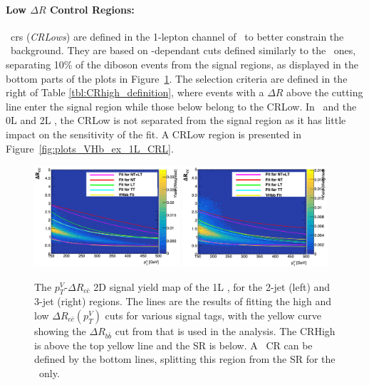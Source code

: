 \paragraph{Low $\Delta R$ Control Regions:} \lowdr\ \glspl{cr} (\textit{CRLows}) are defined in the 1-lepton channel of \vhb\ to better constrain the \whf\ background. They are based on \ptv-dependant cuts defined similarly to the \highdr\ ones, separating 10\% of the diboson events from the signal regions, as displayed in the bottom parts of the plots in Figure~\ref{fig:drccptvCutsVHcc}. The selection criteria are defined in the right of Table \ref{tbl:CRhigh_definition}, where events with a $\Delta R$ above the cutting line enter the signal region while those below belong to the CRLow. In \vhc\ and the 0L and 2L \vhb, the CRLow is not separated from the signal region as it has little impact on the sensitivity of the fit. A CRLow region is presented in Figure~\ref{fig:plots_VHb_ex_1L_CRL}.

\begin{figure}[h!]
  \center
  \includegraphics[width=0.48\textwidth]{Images/VH/dRccpTV/sr1.png}
  \includegraphics[width=0.48\textwidth]{Images/VH/dRccpTV/sr2.png}
  \caption{The $p_T^V$-$\Delta R_{c\bar{c}}$ 2D signal yield map of the 1L \vhc, for the 2-jet (left) and 3-jet (right) regions. The lines are the results of fitting the high and low $\Delta R_{c\bar{c}}(p_T^V)$ cuts for various signal tags, with the yellow curve showing the $\Delta R_{b\bar{b}}$ cut from \vhb that is used in the analysis. The CRHigh is above the top yellow line and the SR is below. A \lowdr\ CR can be defined by the bottom lines, splitting this region from the SR for the \vhb\ only.} 
  \label{fig:drccptvCutsVHcc}
\end{figure}

